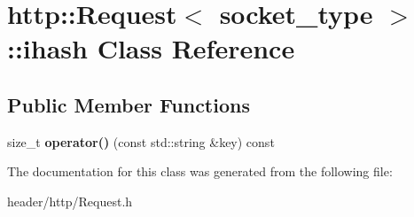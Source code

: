 \hypertarget{classhttp_1_1_request_1_1ihash}{}\section{http\+:\+:Request$<$ socket\+\_\+type $>$\+:\+:ihash Class Reference}
\label{classhttp_1_1_request_1_1ihash}
\subsection*{Public Member Functions}
\begin{DoxyCompactItemize}
\item 
\mbox{\label{classhttp_1_1_request_1_1ihash_acd9c30d020432330b333afde0aff0a70}} 
size\+\_\+t {\bfseries operator()} (const std\+::string \&key) const
\end{DoxyCompactItemize}


The documentation for this class was generated from the following file\+:\begin{DoxyCompactItemize}
\item 
header/http/Request.\+h\end{DoxyCompactItemize}
